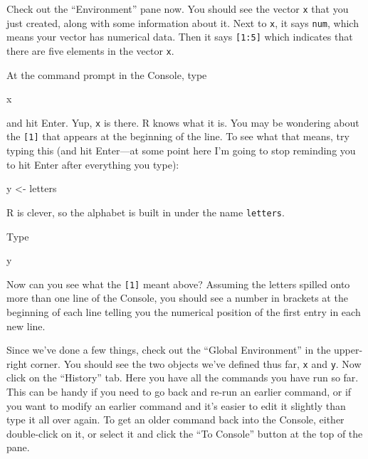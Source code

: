 \documentclass[
]{book}
\newenvironment{Shaded}{\begin{snugshade}}{\end{snugshade}}
\newcommand{\NormalTok}[1]{#1}
\newcommand{\OtherTok}[1]{\textcolor[rgb]{0.56,0.35,0.01}{#1}}
\begin{document}
Check out the ``Environment'' pane now. You should see the vector \texttt{x} that you just created, along with some information about it. Next to \texttt{x}, it says \texttt{num}, which means your vector has numerical data. Then it says \texttt{{[}1:5{]}} which indicates that there are five elements in the vector \texttt{x}.

At the command prompt in the Console, type

\begin{Shaded}
\begin{Highlighting}[]
\NormalTok{x}
\end{Highlighting}
\end{Shaded}

and hit Enter. Yup, \texttt{x} is there. R knows what it is. You may be wondering about the \texttt{{[}1{]}} that appears at the beginning of the line. To see what that means, try typing this (and hit Enter---at some point here I'm going to stop reminding you to hit Enter after everything you type):

\begin{Shaded}
\begin{Highlighting}[]
\NormalTok{y }\OtherTok{\textless{}{-}}\NormalTok{ letters}
\end{Highlighting}
\end{Shaded}

R is clever, so the alphabet is built in under the name \texttt{letters}.

Type

\begin{Shaded}
\begin{Highlighting}[]
\NormalTok{y}
\end{Highlighting}
\end{Shaded}

Now can you see what the \texttt{{[}1{]}} meant above? Assuming the letters spilled onto more than one line of the Console, you should see a number in brackets at the beginning of each line telling you the numerical position of the first entry in each new line.

Since we've done a few things, check out the ``Global Environment'' in the upper-right corner. You should see the two objects we've defined thus far, \texttt{x} and \texttt{y}. Now click on the ``History'' tab. Here you have all the commands you have run so far. This can be handy if you need to go back and re-run an earlier command, or if you want to modify an earlier command and it's easier to edit it slightly than type it all over again. To get an older command back into the Console, either double-click on it, or select it and click the ``To Console'' button at the top of the pane.
\end{document}
